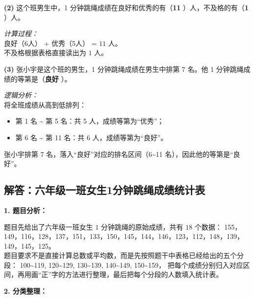 {\small
\textbf{(2)} 这个班男生中，1 分钟跳绳成绩在良好和优秀的有（\quad \textbf{11} \quad）人，不及格的有（\quad \textbf{1} \quad）人。

\vspace{0.2cm}
\textit{计算过程：} \\
良好（6人） + 优秀（5人） = $11$ 人。\\
不及格根据表格直接读出为 $1$ 人。

\vspace{0.6cm}
\textbf{(3)} 张小宇是这个班的男生，1 分钟跳绳成绩在男生中排第 7 名。他 1 分钟跳绳成绩的等第是（\quad \textbf{良好} \quad）。

\vspace{0.2cm}
\textit{逻辑分析：} \\
将全班成绩从高到低排列：
\begin{itemize}
  \item 第 1 名 \textasciitilde{} 第 5 名：共 5 人，成绩等第为“优秀”；
  \item 第 6 名 \textasciitilde{} 第 11 名：共 6 人，成绩等第为“良好”。
\end{itemize}
张小宇排第 7 名，落入“良好”对应的排名区间（6\textasciitilde11 名），因此他的等第是“良好”。
}

\newpage

\subsection{解答：六年级一班女生1分钟跳绳成绩统计表}

\vspace{0.4cm}

\noindent\textbf{1. 题目分析：}

\vspace{0.2cm}

\noindent
题目先给出了六年级一班女生 $1$ 分钟跳绳的原始成绩，共有 $18$ 个数据：
155，149，116，128，137，151，133，150，145，144，146，123，112，148，139，149，145，125。\\[4pt]
题目要求不是直接计算总数或平均数，而是先按照题干中表格已经给出的五个分段：
100\textasciitilde119, 120\textasciitilde129, 130\textasciitilde139, 140\textasciitilde149, 150\textasciitilde159，
把每个成绩分别归入对应区间，再用画“正”字的方法进行整理，最后把每个分段的人数填入统计表。

\vspace{0.4cm}

\noindent\textbf{2. 分类整理：}

\vspace{0.2cm}

